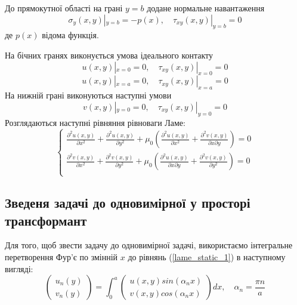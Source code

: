 До прямокутної області на грані $y=b$ додане нормальне навантаження
\begin{equation}
    \sigma_y(x, y) |_{y=b} = -p(x), \quad  \tau_{xy}(x,y) |_{y=b} =0
\end{equation}
де $p(x)$ відома функція.

На бічних гранях виконується умова ідеального контакту
\begin{equation}\label{bound_1_static_1}
    u(x,y) |_{x=0} = 0, \quad \tau_{xy}(x,y) |_{x=0} =0
\end{equation}
\begin{equation}\label{bound_2_static_1}
    u(x,y) |_{x=a} = 0, \quad \tau_{xy}(x,y) |_{x=a} =0
\end{equation}
На нижній грані виконуються наступні умови
\begin{equation}
    v(x,y) |_{y=0} = 0, \quad \tau_{xy}(x,y) |_{y=0} =0
\end{equation}
Розглядаються наступні рівняння рівноваги Ламе:
\begin{equation}\label{lame_static_1}
    \begin{cases}
        \frac{\partial^2 u(x,y)}{\partial x^2} + \frac{\partial^2 u(x,y)}{\partial y^2} + \mu_0 (\frac{\partial^2 u(x,y)}{\partial x^2} + \frac{\partial^2 v(x,y)}{\partial x\partial y}) = 0 \\
        \frac{\partial^2 v(x,y)}{\partial x^2} + \frac{\partial^2 v(x,y)}{\partial y^2} + \mu_0 (\frac{\partial^2 u(x,y)}{\partial x \partial y} + \frac{\partial^2 v(x,y)}{\partial y^2}) = 0 \\
    \end{cases}
\end{equation}

\subsection{Зведеня задачі до одновимірної у просторі трансформант}
Для того, щоб звести задачу до одновимірної задачі, використаємо інтегральне перетворення Фур'є по змінній $x$ до рівнянь (\ref{lame_static_1}) в наступному вигляді:
\begin{equation}
    \begin{pmatrix}
        u_n(y) \\
        v_n(y)
    \end{pmatrix} = \int_{0}^{a} 
    \begin{pmatrix}
        u(x,y) sin(\alpha_n x) \\
        v(x,y) cos(\alpha_n x)
    \end{pmatrix} dx, \quad \alpha_n = \frac{\pi n}{a}
\end{equation}

